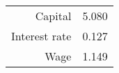 \begin{center}
\begin{tabular}{r c}
\hline Capital  & 5.080 \\ 
Interest rate & 0.127 \\ 
Wage & 1.149 \\ \hline
\end{tabular}
\end{center}